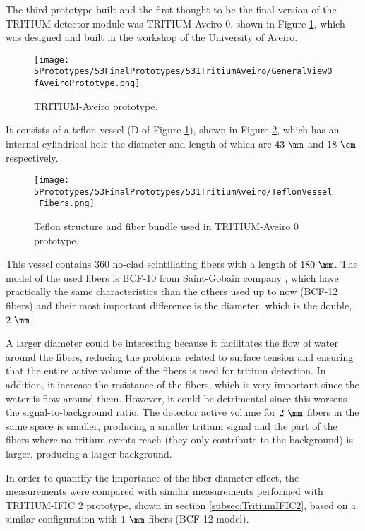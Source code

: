 The third prototype built and the first thought to be the final version of the TRITIUM detector module was TRITIUM-Aveiro 0, shown in Figure \ref{fig:TritiumAveiro0}, which was designed and built in the workshop of the University of Aveiro. 

\begin{figure}[h]
\centering
\texttt{[image: 5Prototypes/53FinalPrototypes/531TritiumAveiro/GeneralViewOfAveiroPrototype.png]}
\caption{TRITIUM-Aveiro prototype.\label{fig:TritiumAveiro0}}
\end{figure}


It consists of a teflon vessel (D of Figure \ref{fig:TritiumAveiro0}), shown in Figure \ref{fig:TeflonStructureFibersTritiumAveiro0}, which has an internal cylindrical hole the diameter and length of which are $43~\mm$ and $18~\cm$ respectively. 

\begin{figure}[h]
\centering
\texttt{[image: 5Prototypes/53FinalPrototypes/531TritiumAveiro/TeflonVessel\_Fibers.png]}
\caption{Teflon structure and fiber bundle used in TRITIUM-Aveiro 0 prototype.\label{fig:TeflonStructureFibersTritiumAveiro0}}
\end{figure}

This vessel contains $360$ no-clad scintillating fibers with a length of $180~\mm$. The model of the used fibers is BCF-10 from Saint-Gobain company \cite{DataSheetBCF10Fiber}, which have practically the same characteristics than the others used up to now (BCF-12 fibers) and their most important difference is the diameter, which is the double, $2~\mm$.

A larger diameter could be interesting because it facilitates the flow of water around the fibers, reducing the problems related to surface tension and ensuring that the entire active volume of the fibers is used for tritium detection. In addition, it increase the resistance of the fibers, which is very important since the water is flow around them. However, it could be detrimental since this worsens the signal-to-background ratio. The detector active volume for $2~\mm$ fibers in the same space is smaller, producing a smaller tritium signal and the part of the fibers where no tritium events reach (they only contribute to the background) is larger, producing a larger background.

In order to quantify the importance of the fiber diameter effect, the measurements were compared with similar measurements performed with TRITIUM-IFIC 2 prototype, shown in section \ref{subsec:TritiumIFIC2}, based on a similar configuration with $1~\mm$ fibers (BCF-12 model).

